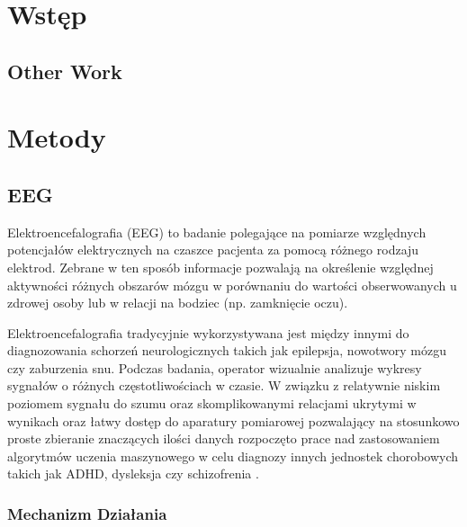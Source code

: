 \documentclass{./assets/wfis}
\begin{document}


\stronatytulowa

\chapter{Wstęp}
\section{Other Work}

\chapter{Metody}
\section{EEG}
Elektroencefalografia (EEG) to badanie polegające na pomiarze względnych potencjałów elektrycznych na czaszce pacjenta za pomocą różnego rodzaju elektrod. Zebrane w ten sposób informacje pozwalają na określenie względnej aktywności różnych obszarów mózgu w porównaniu do wartości obserwowanych u zdrowej osoby lub w relacji na bodziec (np. zamknięcie oczu).

Elektroencefalografia tradycyjnie wykorzystywana jest między innymi do diagnozowania schorzeń neurologicznych takich jak epilepsja, nowotwory mózgu czy zaburzenia snu. Podczas badania, operator wizualnie analizuje wykresy sygnałów o różnych częstotliwościach w czasie. W związku z relatywnie niskim poziomem sygnału do szumu oraz skomplikowanymi relacjami ukrytymi w wynikach oraz łatwy dostęp do aparatury pomiarowej pozwalający na stosunkowo proste zbieranie znaczących ilości danych rozpoczęto prace nad zastosowaniem algorytmów uczenia maszynowego w celu diagnozy innych jednostek chorobowych takich jak ADHD, dysleksja czy schizofrenia \cite{ahire_comprehensive_2022, joshi_review_2021, clarke_eeg_2002}.

\subsection{Mechanizm Działania}
\end{document}
